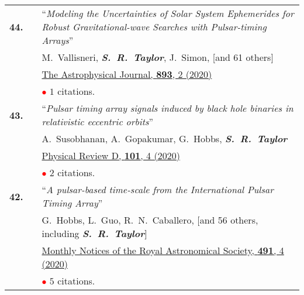 \documentclass[11pt,letterpaper,sans]{moderncv}
\begin{document}
{\begin{longtable}{rp{0.3cm}p{15.8cm}}
\textbf{44.} & & ``\textit{Modeling the Uncertainties of Solar System Ephemerides for Robust Gravitational-wave Searches with Pulsar-timing Arrays}'' \\ 
&&M.~Vallisneri, \textit{\textbf{S.~R.~Taylor}}, J.~Simon, [and 61 others] \\
&& \href{https://ui.adsabs.harvard.edu/link_gateway/2020ApJ...893..112V/PUB_HTML}{{\color{color1} The Astrophysical Journal, \textbf{893}, 2 (2020)}} \\
&& \textcolor{red}{$\bullet$} $1$ citations. \vspace{0.09cm}\\
\textbf{43.} & & ``\textit{Pulsar timing array signals induced by black hole binaries in relativistic eccentric orbits}'' \\ 
&&A.~Susobhanan, A.~Gopakumar, G.~Hobbs, \textit{\textbf{S.~R.~Taylor}}\\
&& \href{https://ui.adsabs.harvard.edu/link_gateway/2020PhRvD.101d3022S/PUB_HTML}{{\color{color1} Physical Review D, \textbf{101}, 4 (2020)}} \\
&& \textcolor{red}{$\bullet$} $2$ citations. \vspace{0.09cm}\\
\textbf{42.} & & ``\textit{A pulsar-based time-scale from the International Pulsar Timing Array}'' \\ 
&&G.~Hobbs, L.~Guo, R.~N.~Caballero, [and 56 others, including \textit{\textbf{S.~R.~Taylor}}] \\
&& \href{https://ui.adsabs.harvard.edu/link_gateway/2020MNRAS.491.5951H/PUB_HTML}{{\color{color1} Monthly Notices of the Royal Astronomical Society, \textbf{491}, 4 (2020)}} \\
&& \textcolor{red}{$\bullet$} $5$ citations. \vspace{0.09cm}\\

\end{longtable}}
\end{document}
